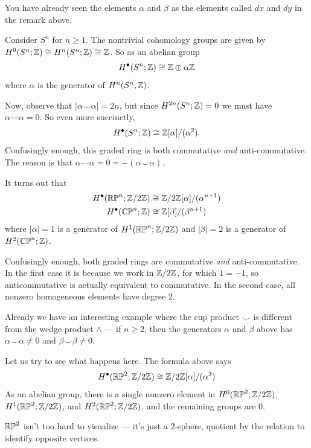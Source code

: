 You have already seen the elements $\alpha$ and $\beta$ as the elements called $dx$ and $dy$ in the
remark above.

\begin{example}
	Consider $S^n$ for $n \ge 1$.
	The nontrivial cohomology groups are given by
	$H^0(S^n; \mathbb Z) \cong H^n(S^n; \mathbb Z) \cong \mathbb Z$.
	So as an abelian group
	\[ H^\bullet(S^n; \mathbb Z) \cong \mathbb Z \oplus \alpha \mathbb Z \]
	where $\alpha$ is the generator of $H^n(S^n, \mathbb Z)$.

	Now, observe that $|\alpha\smile\alpha| = 2n$, but
	since $H^{2n}(S^n; \mathbb Z) = 0$ we must have $\alpha\smile\alpha=0$.
	So even more succinctly,
	\[ H^\bullet(S^n; \mathbb Z) \cong \mathbb Z[\alpha]/(\alpha^2). \]
	Confusingly enough, this graded ring is both
	commutative \emph{and} anti-commutative.
	The reason is that $\alpha \smile \alpha = 0 = -(\alpha \smile \alpha)$.
\end{example}

\begin{example}
	It turns out that
	\begin{align*}
		H^\bullet(\mathbb{RP}^n; \mathbb Z/2\mathbb Z) &\cong \mathbb Z/2\mathbb Z[\alpha]/(\alpha^{n+1}) \\
		H^\bullet(\mathbb{CP}^n; \mathbb Z) &\cong \mathbb Z[\beta]/(\beta^{n+1})
	\end{align*}
	where $|\alpha| = 1$ is a generator of $H^1(\mathbb{RP}^n; \mathbb Z/2\mathbb Z)$
	and $|\beta| = 2$ is a generator of $H^2(\mathbb{CP}^n; \mathbb Z)$.

	Confusingly enough, both graded rings are commutative \emph{and} anti-commutative.
	In the first case it is because we work in $\mathbb Z/2\mathbb Z$, for which $1 = -1$,
	so anticommutative is actually equivalent to commutative.
	In the second case, all nonzero homogeneous elements have degree $2$.
\end{example}

Already we have an interesting example where the cup product $\smile$ is different from the
wedge product $\wedge$ --- if $n \geq 2$, then the generators $\alpha$ and $\beta$ above has
$\alpha \smile \alpha \neq 0$ and $\beta \smile \beta \neq 0$.

Let us try to see what happens here. The formula above says
\[ H^\bullet(\mathbb{RP}^2; \mathbb Z/2\mathbb Z) \cong \mathbb Z/2\mathbb Z[\alpha]/(\alpha^3) \]
As an abelian group, there is a single nonzero element in
$H^0(\mathbb{RP}^2; \mathbb Z/2\mathbb Z)$, $H^1(\mathbb{RP}^2; \mathbb Z/2\mathbb Z)$, and $H^2(\mathbb{RP}^2; \mathbb Z/2\mathbb Z)$,
and the remaining groups are $0$.

$\mathbb{RP}^2$ isn't too hard to visualize --- it's just a $2$-sphere, quotient by the relation to identify
opposite vertices.

